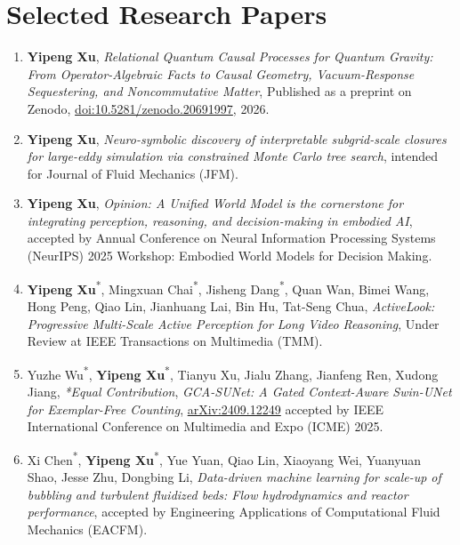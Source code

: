 \section{Selected Research Papers}
\begin{enumerate}[leftmargin=*]
    \item \textbf{Yipeng Xu}, \textit{Relational Quantum Causal Processes for Quantum Gravity: From Operator-Algebraic Facts to Causal Geometry, Vacuum-Response Sequestering, and Noncommutative Matter}, Published as a preprint on Zenodo, \href{https://doi.org/10.5281/zenodo.20691997}{doi:10.5281/zenodo.20691997}, 2026.
    \vspace{-0.5em}        
    \item \textbf{Yipeng Xu}, \textit{Neuro-symbolic discovery of interpretable subgrid-scale closures for large-eddy simulation via constrained Monte Carlo tree search}, intended for Journal of Fluid Mechanics (JFM).
    \vspace{-0.5em}
    \item \textbf{Yipeng Xu}, \textit{Opinion: A Unified World Model is the cornerstone for integrating perception, reasoning, and decision-making in embodied AI}, accepted by Annual Conference on Neural Information Processing Systems (NeurIPS) 2025 Workshop: Embodied World Models for Decision Making.
    \vspace{-0.5em}
    \item \textbf{Yipeng Xu}\textsuperscript{*}, Mingxuan Chai\textsuperscript{*}, Jisheng Dang\textsuperscript{*}, Quan Wan, Bimei Wang, Hong Peng, Qiao Lin, Jianhuang Lai, Bin Hu, Tat-Seng Chua, \textit{ActiveLook: Progressive Multi-Scale Active Perception for Long Video Reasoning}, Under Review at IEEE Transactions on Multimedia (TMM).
    \vspace{-0.5em}
    \item Yuzhe Wu\textsuperscript{*}, \textbf{Yipeng Xu}\textsuperscript{*}, Tianyu Xu, Jialu Zhang, Jianfeng Ren, Xudong Jiang, \textit{*Equal Contribution}, \textit{GCA-SUNet: A Gated Context-Aware Swin-UNet for Exemplar-Free Counting},   \href{https://arxiv.org/pdf/2409.12249}{arXiv:2409.12249} accepted by IEEE International Conference on Multimedia and Expo (ICME) 2025.
    \vspace{-0.5em}
    \item Xi Chen\textsuperscript{*}, \textbf{Yipeng Xu}\textsuperscript{*}, Yue Yuan, Qiao Lin, Xiaoyang Wei, Yuanyuan Shao, Jesse Zhu, Dongbing Li, \textit{Data-driven machine learning for scale-up of bubbling and turbulent fluidized beds: Flow hydrodynamics and reactor performance}, accepted by Engineering Applications of Computational Fluid Mechanics (EACFM).

\end{enumerate}
